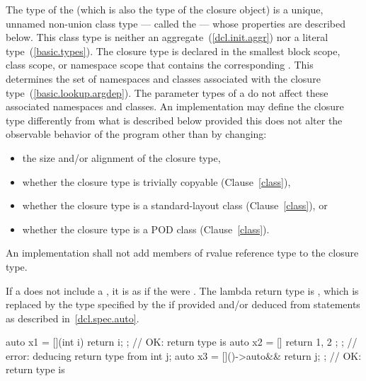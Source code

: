 \pnum
The type of the  (which is also the type of the
closure object) is a unique, unnamed non-union class type --- called the  --- whose properties are described below. This class type is neither an
aggregate~(\ref{dcl.init.aggr}) nor a literal type~(\ref{basic.types}).
The closure type is declared in the smallest block
scope, class scope, or namespace scope that contains the corresponding
. \enternote This determines the set of namespaces and
classes associated with the closure type~(\ref{basic.lookup.argdep}). The parameter
types of a  do not affect these associated namespaces and
classes. \exitnote An implementation may define the closure type differently from what
is described below provided this does not alter the observable behavior of the program
other than by changing:

\begin{itemize}
\item the size and/or alignment of the closure type,

\item whether the closure type is trivially copyable (Clause~\ref{class}),

\item whether the closure type is a standard-layout class (Clause~\ref{class}),
or

\item whether the closure type is a POD class (Clause~\ref{class}).
\end{itemize}

An implementation shall not add members of rvalue reference type to the closure
type.

\pnum
If a  does not include a
, it is as if the  were
\tcode{()}.
The lambda return type is , which is replaced by the
type specified by the
 if provided and/or deduced from
 statements as described in~\ref{dcl.spec.auto}.
\enterexample
\begin{codeblock}
auto x1 = [](int i){ return i; };     // OK: return type is 
auto x2 = []{ return { 1, 2 }; };     // error: deducing return type from 
int j;
auto x3 = []()->auto&& { return j; }; // OK: return type is 
\end{codeblock}
\exitexample

